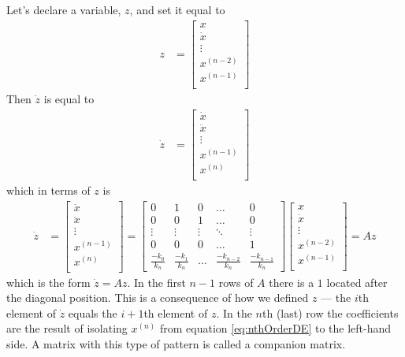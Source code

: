 \documentclass[11pt, oneside]{article}   	%
\begin{document}
Let's declare a variable, $z$, and set it equal to
\begin{align}
z &= \begin{bmatrix}
        x \\
        \dot{x} \\
        \vdots \\
        x^{(n-2)} \\
        x^{(n-1)} \\
      \end{bmatrix}
\end{align}
Then $\dot{z}$ is equal to
\begin{align}
\dot{z} &= \begin{bmatrix}
        \dot{x} \\
        \ddot{x} \\
        \vdots \\
        x^{(n-1)} \\
        x^{(n)} \\
      \end{bmatrix}
\end{align}
which in terms of $z$ is
\begin{align}
\dot{z} &= \begin{bmatrix}
        \dot{x} \\
        \ddot{x} \\
        \vdots \\
        x^{(n-1)} \\
        x^{(n)} \\
      \end{bmatrix}
  =
      \begin{bmatrix}
        0 & 1 & 0 & \dots & 0 \\
        0 & 0 & 1 & \dots & 0 \\
        \vdots & \vdots & \vdots & \ddots & \vdots \\
        0 & 0 & 0 & \dots  & 1 \\
        \frac{-k_0}{k_n} & \frac{-k_1}{k_n} & \dots & \frac{-k_{n-2}}{k_n} & \frac{-k_{n-1}}{k_n}
      \end{bmatrix}
      \begin{bmatrix}
        x \\
        \dot{x} \\
        \vdots \\
        x^{(n-2)} \\
        x^{(n-1)} \\
      \end{bmatrix}
  = Az
\end{align}
which is the form $\dot{z} = Az$.
In the first $n-1$ rows of $A$ there is a $1$ located after the diagonal position.
This is a consequence of how we defined $z$ --- the $i$th element of $\dot{z}$ equals the $i+1$th element of $z$.
In the $n$th (last) row the coefficients are the result of isolating $x^{(n)}$ from equation \ref{eq:nthOrderDE} to the left-hand side.
A matrix with this type of pattern is called a companion matrix.
\end{document}
